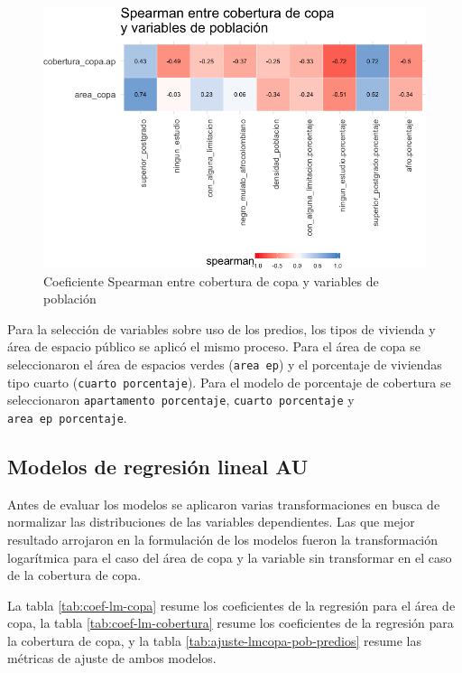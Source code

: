 \documentclass[12pt,a4paper,openany]{book}
\theoremstyle{definition}
\theoremstyle{definition}
\theoremstyle{definition}
\theoremstyle{remark}
\begin{document}
\begin{figure}

{\centering \includegraphics[width=1\linewidth]{tesis-unigis_files/figure-latex/tile-copa-poblacion-spearman-1} 

}

\caption{Coeficiente Spearman entre cobertura de copa
 y variables de población}\label{fig:tile-copa-poblacion-spearman}
\end{figure}

Para la selección de variables sobre uso de los predios, los tipos de
vivienda y área de espacio público se aplicó el mismo proceso. Para el
área de copa se seleccionaron el área de espacios verdes
(\texttt{area\ ep}) y el porcentaje de viviendas tipo cuarto
(\texttt{cuarto\ porcentaje}). Para el modelo de porcentaje de cobertura
se seleccionaron \texttt{apartamento\ porcentaje},
\texttt{cuarto\ porcentaje} y \texttt{area\ ep\ porcentaje}.

\subsection{Modelos de regresión lineal
AU}\label{modelos-de-regresion-lineal-au}

Antes de evaluar los modelos se aplicaron varias transformaciones en
busca de normalizar las distribuciones de las variables dependientes.
Las que mejor resultado arrojaron en la formulación de los modelos
fueron la transformación logarítmica para el caso del área de copa y la
variable sin transformar en el caso de la cobertura de copa.

La tabla \ref{tab:coef-lm-copa} resume los coeficientes de la regresión
para el área de copa, la tabla \ref{tab:coef-lm-cobertura} resume los
coeficientes de la regresión para la cobertura de copa, y la tabla
\ref{tab:ajuste-lmcopa-pob-predios} resume las métricas de ajuste de
ambos modelos.
\end{document}

